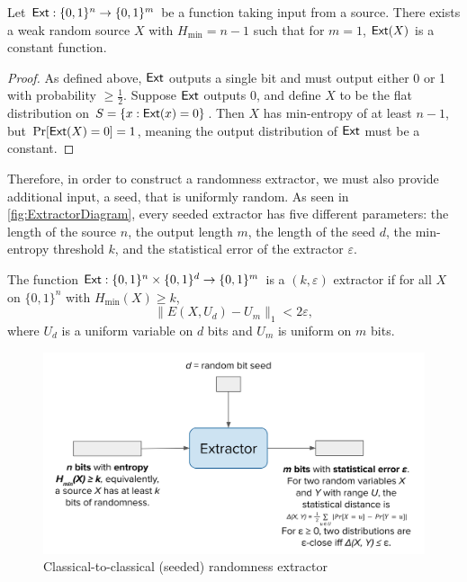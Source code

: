 \begin{proposition}
    Let $\mathsf{Ext}:\{0,1\}^n \rightarrow \{0,1\}^m$ be a function taking input from a source. There exists a weak random source $X$ with $H_{\min} = n-1$ such that for $m=1$, $\mathsf{Ext}(X)$ is a constant function.
\end{proposition}
\begin{proof}
    As defined above, $\mathsf{Ext}$ outputs a single bit and must output either 0 or 1 with probability $\geq \frac{1}{2}$. Suppose $\mathsf{Ext}$ outputs $0$, and define $X$ to be the flat distribution on $S = \{x : \mathsf{Ext}(x) = 0\}$. Then $X$ has min-entropy of at least $n-1$, but $\Pr[\mathsf{Ext}(X) = 0] = 1$, meaning the output distribution of $\mathsf{Ext}$ must be a constant.
\end{proof}

Therefore, in order to construct a randomness extractor, we must also provide additional input, a seed, that is uniformly random. As seen in \autoref{fig:ExtractorDiagram}, every seeded extractor has five different parameters: the length of the source $n$, the output length $m$, the length of the seed $d$, the min-entropy threshold $k$, and the statistical error of the extractor $\varepsilon$. 

\begin{definition}
    The function $\mathsf{Ext} : \{0,1\}^n \times \{0, 1\}^d \rightarrow \{0, 1\}^m$ is a $(k,\varepsilon)$ extractor if for all $X$ on $\{0, 1\}^n$ with $H_{\min}(X) \geq k$, 
    \[
        \|E(X, U_{d}) - U_{m}\|_{1} < 2 \varepsilon,
    \]
    where $U_d$ is a uniform variable on $d$ bits and $U_m$ is uniform on $m$ bits.
\end{definition}

\begin{figure}
    \centering
    \includegraphics[scale=0.18]{Images/CC_extractor_updated.png}
    \caption{Classical-to-classical (seeded) randomness extractor}
    \label{fig:ExtractorDiagram}
\end{figure}

